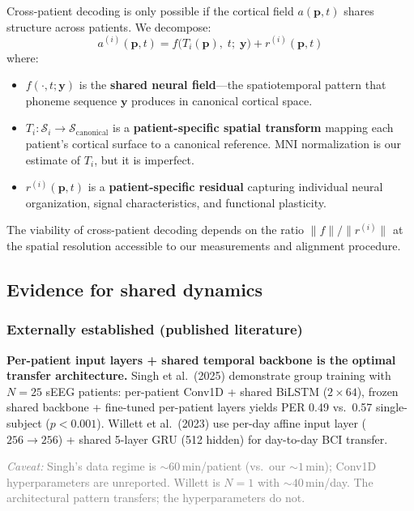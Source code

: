 \documentclass[11pt,letterpaper]{article}
\newcommand{\caveat}[1]{\par\smallskip\noindent\textcolor{gray}{\textit{Caveat:} #1}\smallskip}
\newcommand{\bfp}{\mathbf{p}}
\newcommand{\bfy}{\mathbf{y}}
\newcommand{\cS}{\mathcal{S}}
\begin{document}
Cross-patient decoding is only possible if the cortical field $a(\bfp, t)$ shares structure across patients. We decompose:
\begin{equation}\label{eq:decomposition}
\boxed{a^{(i)}(\bfp, t) = f\bigl(T_i(\bfp),\; t;\; \bfy\bigr) + r^{(i)}(\bfp, t)}
\end{equation}
where:
\begin{itemize}[leftmargin=2em]
\item $f(\cdot, t; \bfy)$ is the \textbf{shared neural field}---the spatiotemporal pattern that phoneme sequence $\bfy$ produces in canonical cortical space.
\item $T_i: \cS_i \to \cS_{\text{canonical}}$ is a \textbf{patient-specific spatial transform} mapping each patient's cortical surface to a canonical reference. MNI normalization is our estimate of $T_i$, but it is imperfect.
\item $r^{(i)}(\bfp, t)$ is a \textbf{patient-specific residual} capturing individual neural organization, signal characteristics, and functional plasticity.
\end{itemize}
The viability of cross-patient decoding depends on the ratio $\|f\| / \|r^{(i)}\|$ at the spatial resolution accessible to our measurements and alignment procedure.

\subsection{Evidence for shared dynamics}

\subsubsection{Externally established (published literature)}

\textbf{Per-patient input layers + shared temporal backbone is the optimal transfer architecture.} Singh et al.\ (2025) demonstrate group training with $N{=}25$ sEEG patients: per-patient Conv1D + shared BiLSTM ($2{\times}64$), frozen shared backbone + fine-tuned per-patient layers yields PER 0.49 vs.\ 0.57 single-subject ($p{<}0.001$). Willett et al.\ (2023) use per-day affine input layer ($256{\to}256$) + shared 5-layer GRU (512 hidden) for day-to-day BCI transfer.

\caveat{Singh's data regime is ${\sim}60$\,min/patient (vs.\ our ${\sim}1$\,min); Conv1D hyperparameters are unreported. Willett is $N{=}1$ with ${\sim}40$\,min/day. The architectural pattern transfers; the hyperparameters do not.}
\end{document}
